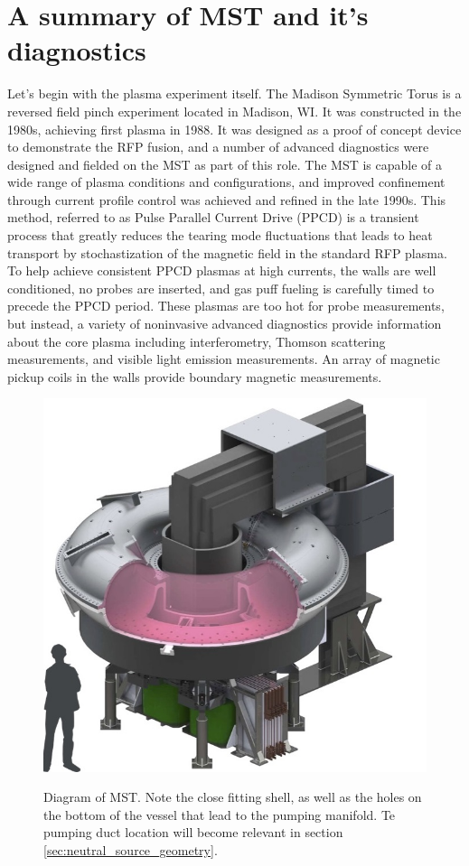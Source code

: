 \section{A summary of MST and it's diagnostics}\label{sec:MST}
Let's begin with the plasma experiment itself. The Madison Symmetric Torus is a reversed field pinch experiment located in Madison, WI. It was constructed in the 1980s, achieving first plasma in 1988\cite{Dexter1991}. It was designed as a proof of concept device to demonstrate the RFP fusion\cite{Najmabadi1999}, and a number of advanced diagnostics were designed and fielded on the MST as part of this role. The MST is capable of a wide range of plasma conditions and configurations, and improved confinement through current profile control was achieved and refined in the late 1990s\cite{Sarff1995, Chapman2002}. This method, referred to as Pulse Parallel Current Drive (PPCD) is a transient process that greatly reduces the tearing mode fluctuations that leads to heat transport by stochastization of the magnetic field in the standard RFP plasma. To help achieve consistent PPCD plasmas at high currents, the walls are well conditioned, no probes are inserted, and gas puff fueling is carefully timed to precede the PPCD period. These plasmas are too hot for probe measurements, but instead, a variety of noninvasive advanced diagnostics provide information about the core plasma including interferometry, Thomson scattering measurements, and visible light emission measurements. An array of magnetic pickup coils in the walls provide boundary magnetic measurements. 

\begin{figure}[!htb]
	\centering
	\includegraphics{./implementation/MST_model_diagram}
	\label{fig:MST_diagram}
	\caption[Diagram of MST]{Diagram of MST. Note the close fitting shell, as well as the holes on the bottom of the vessel that lead to the pumping manifold. Te pumping duct location will become relevant in section \ref{sec:neutral_source_geometry}.}
\end{figure}

